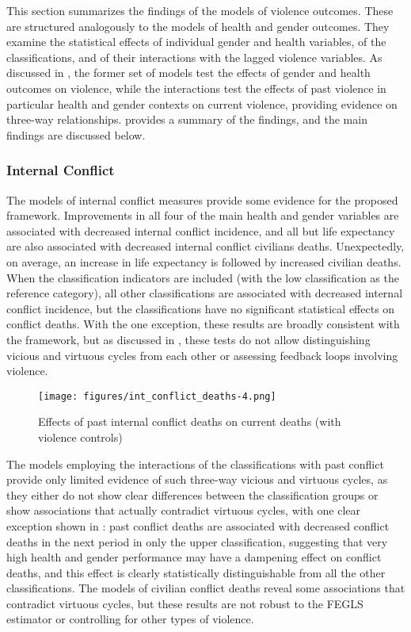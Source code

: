 \documentclass[12pt]{article}
\begin{document}
This section summarizes the findings of the models of violence outcomes. These are structured analogously to the models of health and gender outcomes. They examine the statistical effects of individual gender and health variables, of the classifications, and of their interactions with the lagged violence variables. As discussed in , the former set of models test the effects of gender and health outcomes on violence, while the interactions test the effects of past violence in particular health and gender contexts on current violence, providing evidence on three-way relationships.
 provides a summary of the findings, and the main findings are discussed below.



\subsubsection{Internal Conflict}

The models of internal conflict measures provide some evidence for the proposed framework.
Improvements in all four of the main health and gender variables are associated with decreased internal conflict incidence, and all but life expectancy are also associated with decreased internal conflict civilians deaths.
Unexpectedly, on average, an increase in life expectancy is followed by increased civilian deaths.
When the classification indicators are included (with the low classification as the reference category), all other classifications are associated with decreased internal conflict incidence, but the classifications have no significant statistical effects on conflict deaths.
With the one exception, these results are broadly consistent with the framework, but as discussed in , these tests do not allow distinguishing vicious and virtuous cycles from each other or assessing feedback loops involving violence.

\begin{figure}[!htb]
    \centering
    \caption{Effects of past internal conflict deaths on current deaths (with violence controls)}
    \label{int_conflict_deaths}
    \texttt{[image: figures/int\_conflict\_deaths-4.png]}
\end{figure}

The models employing the interactions of the classifications with past conflict provide only limited evidence of such three-way vicious and virtuous cycles, as they either do not show clear differences between the classification groups or show associations that actually contradict virtuous cycles, with one clear exception shown in : past conflict deaths are associated with decreased conflict deaths in the next period in only the upper classification, suggesting that very high health and gender performance may have a dampening effect on conflict deaths, and this effect is clearly statistically distinguishable from all the other classifications.
The models of civilian conflict deaths reveal some associations that contradict virtuous cycles, but these results are not robust to the FEGLS estimator or controlling for other types of violence.
\end{document}
